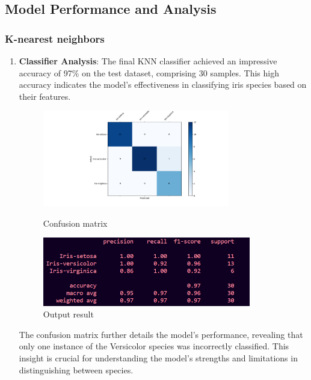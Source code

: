 \documentclass[a4paper]{article}
\begin{document}
\subsection{Model Performance and Analysis}

\subsubsection{K-nearest neighbors}
\begin{enumerate}
	\item \textbf{Classifier Analysis}: The final KNN classifier achieved an impressive accuracy of 97\% on the test dataset, comprising 30 samples. This high accuracy indicates the model's effectiveness in classifying iris species based on their features.
\begin{figure}[h]
	\begin{minipage}{0.32\textwidth}
	\centering
	\includegraphics[height=4.2cm]{picture/KNN_confusion_matrix} %
	\caption{Confusion matrix}
	\label{fig:setosa}
\end{minipage}\hspace{3cm}
\begin{minipage}{0.32\textwidth}
	\centering
	\includegraphics[height=3cm]{picture/KNN_Classifier_result} %
	\caption{Output result}
	\label{fig:versicolour}
\end{minipage}\hfill
\end{figure}

The confusion matrix further details the model's performance, revealing that only one instance of the Versicolor species was incorrectly classified. This insight is crucial for understanding the model's strengths and limitations in distinguishing between species.


\end{enumerate}
\end{document}
